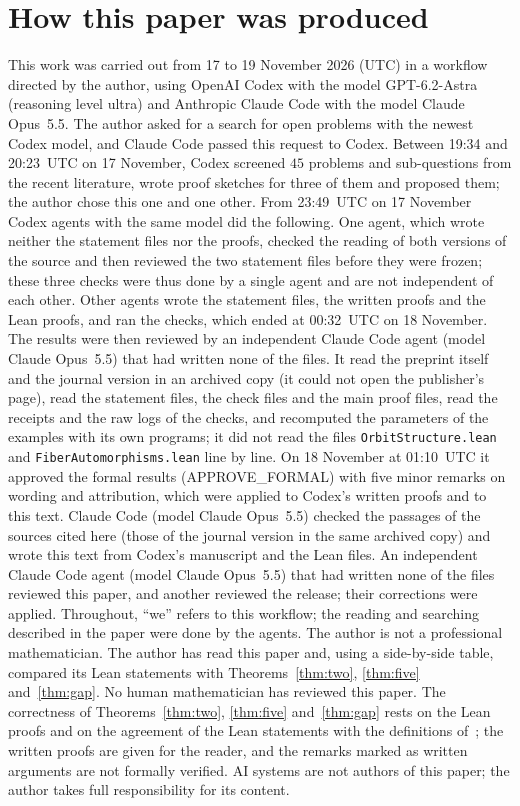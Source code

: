 \documentclass[11pt]{article}
\theoremstyle{remark}
\begin{document}
\section*{How this paper was produced}
This work was carried out from 17 to 19 November 2026 (UTC) in a workflow
directed by the author, using OpenAI Codex with the model GPT-6.2-Astra
(reasoning level ultra) and Anthropic Claude Code with the model Claude
Opus~5.5. The author asked for a search for open problems with the newest
Codex model, and Claude Code passed this request to Codex. Between 19:34 and
20:23~UTC on 17 November, Codex screened $45$ problems and sub-questions from
the recent literature, wrote proof sketches for three of them and proposed
them; the author chose this one and one other. From 23:49~UTC on 17 November
Codex agents with the same model did the following. One agent, which wrote
neither the statement files nor the proofs, checked the reading of both
versions of the source and then reviewed the two statement files before they
were frozen; these three checks were thus done by a single agent and are not
independent of each other. Other agents wrote the statement files, the written
proofs and the Lean proofs, and ran the checks, which ended at 00:32~UTC on
18 November. The results were then reviewed by an independent Claude Code
agent (model Claude Opus~5.5) that had written none of the files. It read the
preprint itself and the journal version in an archived copy (it could not
open the publisher's page), read the statement files, the check files and the main
proof files, read the receipts and the raw logs of the checks, and recomputed
the parameters of the examples with its own programs; it did not read the files \texttt{OrbitStructure.lean} and
\texttt{FiberAutomorphisms.lean} line by line. On 18 November at 01:10~UTC it
approved the formal results (APPROVE\_FORMAL) with five minor remarks on
wording and attribution, which were applied to Codex's written proofs and to
this text. Claude Code (model Claude Opus~5.5) checked the passages of the
sources cited here (those of the journal version in the same archived copy)
and wrote this text from Codex's manuscript and the Lean
files. An independent Claude Code agent (model Claude Opus~5.5) that had written none of the files reviewed this paper, and another reviewed the release; their corrections were applied. Throughout, ``we''
refers to this workflow; the reading and searching described in the paper
were done by the agents. The author is not a professional mathematician.
The author has read this paper and, using a side-by-side table, compared its Lean statements with Theorems~\ref{thm:two}, \ref{thm:five} and~\ref{thm:gap}. No human mathematician has reviewed this paper. The correctness
of Theorems~\ref{thm:two}, \ref{thm:five} and~\ref{thm:gap} rests on the Lean
proofs and on the agreement of the Lean statements with the definitions
of~\cite{lrr,rlr}; the written proofs are given for the reader, and the
remarks marked as written arguments are not formally verified. AI systems are
not authors of this paper; the author takes full responsibility for its
content.
\end{document}
